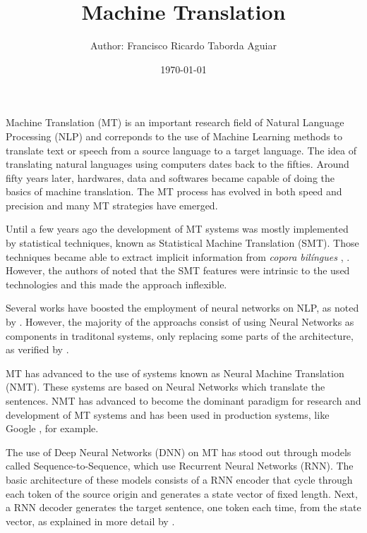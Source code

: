 \documentclass[a4paper]{article}
\title{
    Machine Translation\\
}
\author{
    \small{Author: Francisco Ricardo Taborda Aguiar}\\
}
\date{\today}
\begin{document}
    \maketitle

    Machine Translation (MT) is an important research field of 
    Natural Language Processing (NLP) and correponds to the use 
    of Machine Learning methods to translate text or speech from 
    a source language to a target language. 
    The idea of translating natural languages using computers dates 
    back to the fifties.     
    Around fifty years later, hardwares, data and softwares became 
    capable of doing the basics of machine translation.
    The MT process has evolved in both speed and precision and 
    many MT strategies have emerged.

    Until a few years ago the development of MT systems was mostly 
    implemented by statistical techniques, known as 
    Statistical Machine Translation (SMT).
    Those techniques became able to extract implicit information from
    \emph{copora bil\'ingues} , \cite{brown:1993}.
    However, the authors of \cite{maruf:2021} noted that the SMT features
    were intrinsic to the used technologies and this made the approach
    inflexible. 
    
    Several works have boosted the employment of neural 
    networks on NLP, as noted by \cite{goldberg:2016}.
    However, the majority of the approachs consist of using Neural Networks
    as components in traditonal systems, only replacing some parts of the
    architecture, as verified by \cite{stahlberg:2020}.   

    MT has advanced to the use of systems known as 
    Neural Machine Translation (NMT). These systems are based on Neural 
    Networks which translate the sentences.
    NMT has advanced to become the dominant paradigm for research 
    and development of  MT systems \cite{tan:2020} and has been used 
    in production systems, like Google \cite{wu:2016}, for example.

    The use of Deep Neural Networks (DNN) on MT has stood out through 
    models called Sequence-to-Sequence, which use Recurrent Neural Networks
    (RNN). The basic architecture of these models consists of a RNN encoder
    that cycle through each token of the source origin and generates a 
    state vector of fixed length.
    Next, a RNN decoder generates the target sentence, one token each time,
    from the state vector, as explained in more detail by \cite{sutskever:2014}.
\end{document}
